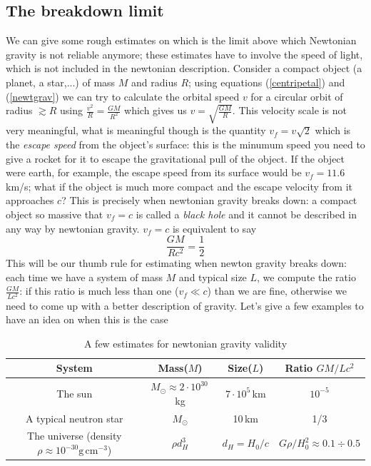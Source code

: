 \documentclass[11pt, a4paper,oneside,openright]{book}
\numberwithin{equation}{section}
\begin{document}
\subsection{The breakdown limit}
We can give some rough estimates on which is the limit above which Newtonian gravity is not reliable anymore; these estimates have to involve the speed of light, which is not included in the newtonian description. Consider a compact object (a planet, a star,...) of mass $M$ and radius $R$; using equations (\ref{centripetal}) and (\ref{newtgrav}) we can try to calculate the orbital speed $v$ for a circular orbit of radius $\gtrsim R$ using $\frac{v^2}{R}=\frac{GM}{R^2}$ which gives us $v=\sqrt{\frac{GM}{R}}$. This velocity scale is not very meaningful, what is meaningful though is the quantity $v_f=v\sqrt{2}$ which is the \textit{escape speed} from the object's surface: this is the minumum speed you need to give a rocket for it to escape the gravitational pull of the object. If the object were earth, for example, the escape speed from its surface would be $v_f=11.6$\,km/s; what if the object is much more compact and the escape velocity from it approaches $c$? This is precisely when newtonian gravity breaks 
down: a compact object so massive that $v_f=c$ is called a \textit{black hole} and it cannot be described in any way by newtonian gravity. $v_f=c$ is equivalent to say
\begin{equation}
\label{stronggrav}
\frac{GM}{Rc^2}=\frac{1}{2}
\end{equation} 
This will be our thumb rule for estimating when newton gravity breaks down: each time we have a system of mass $M$ and typical size $L$, we compute the ratio $\frac{GM}{Lc^2}$: if this ratio is much less than one ($v_f\ll c$) than we are fine, otherwise we need to come up with a better description of gravity. Let's give a few examples to have an idea on when this is the case
\begin{table}[htdp]
\begin{center}
\begin{tabular}{|c|c|c|c|} \hline
\textbf{System} & \textbf{Mass}($M$) & \textbf{Size}($L$) & \textbf{Ratio} $GM/Lc^2$ \\ \hline
The sun & $M_\odot\approx 2\cdot 10^{30}$\,kg & $7\cdot10^5$\,km &$10^{-5}$ \\ \hline
A typical neutron star & $M_\odot$ & 10\,km &1/3 \\ \hline
The universe (density $\rho \approx 10^{-30}\mathrm{g}\,\mathrm{cm}^{-3}$)& $\rho d_H^3$ & $d_H=H_0/c$ &$G\rho/H_0^2\approx 0.1\div0.5$ \\ \hline

\end{tabular}
\end{center}
\caption{A few estimates for newtonian gravity validity}
\end{table}
\end{document}
